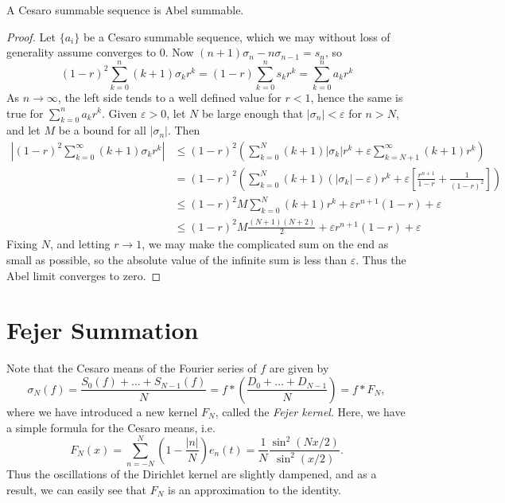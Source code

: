 \begin{theorem}
    A Cesaro summable sequence is Abel summable.
\end{theorem}
\begin{proof}
    Let $\{ a_i \}$ be a Cesaro summable sequence, which we may without loss of generality assume converges to $0$. Now $(n + 1)\sigma_n - n \sigma_{n-1} = s_n$, so
    \[ (1 - r)^2 \sum_{k = 0}^n (k + 1) \sigma_k r^k = (1 - r) \sum_{k = 0}^n s_k r^k = \sum_{k = 0}^n a_k r^k \]
    As $n \to \infty$, the left side tends to a well defined value for $r < 1$, hence the same is true for $\sum_{k = 0}^n a_k r^k$. Given $\varepsilon > 0$, let $N$ be large enough that $|\sigma_n| < \varepsilon$ for $n > N$, and let $M$ be a bound for all $|\sigma_n|$. Then
    \begin{align*}
        \left| (1 - r)^2 \sum_{k = 0}^\infty (k + 1) \sigma_k r^k \right| &\leq (1 - r)^2 \left( \sum_{k = 0}^N (k + 1) |\sigma_k| r^k + \varepsilon \sum_{k = N+1}^\infty (k + 1) r^k \right)\\
        &= (1 - r)^2 \left( \sum_{k = 0}^N (k + 1) (|\sigma_k| - \varepsilon) r^k + \varepsilon \left[ \frac{r^{n+1}}{1-r} + \frac{1}{(1 - r)^2} \right] \right)\\
        &\leq (1 - r)^2 M \sum_{k = 0}^N (k + 1) r^k + \varepsilon r^{n+1} (1 - r) + \varepsilon\\
        &\leq (1 - r)^2 M \frac{(N+1)(N+2)}{2} + \varepsilon r^{n+1} (1 - r) + \varepsilon
    \end{align*}
    Fixing $N$, and letting $r \to 1$, we may make the complicated sum on the end as small as possible, so the absolute value of the infinite sum is less than $\varepsilon$. Thus the Abel limit converges to zero.
\end{proof}

\section{Fejer Summation}

Note that the Cesaro means of the Fourier series of $f$ are given by
%
\[ \sigma_N(f) = \frac{S_0(f) + \dots + S_{N-1}(f)}{N} = f * \left( \frac{D_0 + \dots + D_{N-1}}{N} \right) = f * F_N, \]
%
where we have introduced a new kernel $F_N$, called the \emph{Fejer kernel}. Here, we have a simple formula for the Cesaro means, i.e.
%
\[ F_N(x) = \sum_{n = -N}^N \left( 1 - \frac{|n|}{N} \right) e_n(t) = \frac{1}{N} \frac{\sin^2(Nx/2)}{\sin^2(x/2)}. \]
%
Thus the oscillations of the Dirichlet kernel are slightly dampened, and as a result, we can easily see that $F_N$ is an approximation to the identity.

